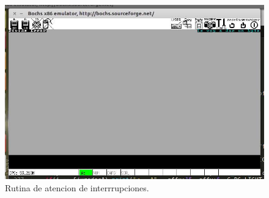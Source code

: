   \begin{figure}[H]
\begin{center}
  \includegraphics[width=\linewidth]{ejercicio2/division.jpg}
  \caption{{\small Rutina de atencion de interrrupciones.} }
\endminipage
\end{center}
\end{figure}

